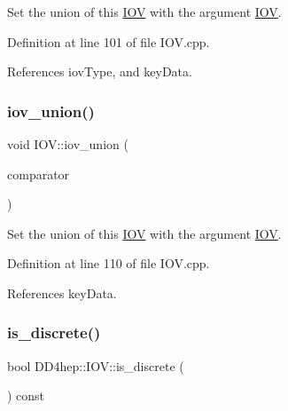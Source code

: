 Set the union of this \hyperlink{class_d_d4hep_1_1_i_o_v}{I\+OV} with the argument \hyperlink{class_d_d4hep_1_1_i_o_v}{I\+OV}. 



Definition at line 101 of file I\+O\+V.\+cpp.



References iov\+Type, and key\+Data.

\hypertarget{class_d_d4hep_1_1_i_o_v_ad6a050933305a95b61d26975c057590e}{}\label{class_d_d4hep_1_1_i_o_v_ad6a050933305a95b61d26975c057590e} 
\subsubsection{\texorpdfstring{iov\+\_\+union()}{iov\_union()}\hspace{0.1cm}{\footnotesize\ttfamily [2/2]}}
{\footnotesize\ttfamily void I\+O\+V\+::iov\+\_\+union (\begin{DoxyParamCaption}\item[{const \hyperlink{class_d_d4hep_1_1_i_o_v_a07cb46dc875296dc9cccf4ff370104ae}{I\+O\+V\+::\+Key} \&}]{comparator }\end{DoxyParamCaption})}



Set the union of this \hyperlink{class_d_d4hep_1_1_i_o_v}{I\+OV} with the argument \hyperlink{class_d_d4hep_1_1_i_o_v}{I\+OV}. 



Definition at line 110 of file I\+O\+V.\+cpp.



References key\+Data.

\hypertarget{class_d_d4hep_1_1_i_o_v_a28a460a88a706f5fa656f1e4be66e311}{}\label{class_d_d4hep_1_1_i_o_v_a28a460a88a706f5fa656f1e4be66e311} 
\subsubsection{\texorpdfstring{is\+\_\+discrete()}{is\_discrete()}}
{\footnotesize\ttfamily bool D\+D4hep\+::\+I\+O\+V\+::is\+\_\+discrete (\begin{DoxyParamCaption}{ }\end{DoxyParamCaption}) const\hspace{0.3cm}{\ttfamily [inline]}}



